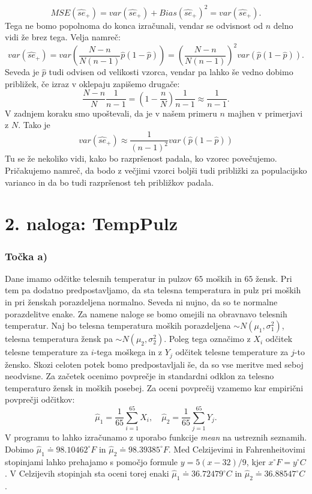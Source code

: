\documentclass[12pt, letterpaper]{article}
\begin{document}
\[
MSE(\hat{se}_+) = var(\hat{se}_+) + Bias(\hat{se}_+)^2 = var(\hat{se}_+).
\]
Tega ne bomo popolnoma do konca izračunali, vendar se odvisnost od $n$ delno vidi že brez tega. Velja namreč:
\[
var(\hat{se}_+) = var\left(\frac{N-n}{N(n-1)}\hat{p}(1 - \hat{p})\right) = \left(\frac{N-n}{N(n-1)}\right)^2 var(\hat{p}(1 - \hat{p})).
\]
Seveda je $\hat{p}$ tudi odvisen od velikosti vzorca, vendar pa lahko še vedno dobimo približek, če izraz v oklepaju zapišemo drugače:
\[
\frac{N-n}{N}\frac{1}{n-1} = \left(1 - \frac{n}{N}\right)\frac{1}{n-1} \approx \frac{1}{n-1}.
\]
V zadnjem koraku smo upoštevali, da je v našem primeru $n$ majhen v primerjavi z $N$. Tako je
\[
var(\hat{se}_+) \approx \frac{1}{(n-1)^2}var(\hat{p}(1 - \hat{p}))
\]
Tu se že nekoliko vidi, kako bo razpršenost padala, ko vzorec povečujemo. Pričakujemo namreč, da bodo z večjimi vzorci boljši tudi približki za populacijsko varianco in da bo tudi razpršenost teh približkov padala.

\section*{2. naloga: TempPulz}

\subsubsection*{Točka a)} Dane imamo odčitke telesnih temperatur in pulzov $65$ moških in $65$ žensk. Pri tem pa dodatno predpostavljamo, da sta telesna temperatura in pulz pri moških in pri ženskah porazdeljena normalno. Seveda ni nujno, da so te normalne porazdelitve enake. Za namene naloge se bomo omejili na obravnavo telesnih temperatur. Naj bo telesna temperatura moških porazdeljena $\sim N(\mu_1, \sigma^2_1)$, telesna temperatura žensk pa $\sim N(\mu_2,\sigma^2_2)$. Poleg tega označimo z $X_i$ odčitek telesne temperature za $i$-tega moškega in z $Y_j$ odčitek telesne temperature za $j$-to žensko. Skozi celoten potek bomo predpostavljali še, da so vse meritve med seboj neodvisne. Za začetek ocenimo povprečje in standardni odklon za telesno temperaturo žensk in moških posebej. Za oceni povprečij vzamemo kar empirični povprečji odčitkov:
\[
\hat{\mu}_1 = \frac{1}{65}\sum_{i=1}^{65} X_i, \quad \hat{\mu}_2 = \frac{1}{65}\sum_{j=1}^{65} Y_j.
\]
V programu to lahko izračunamo z uporabo funkcije \emph{mean} na ustreznih seznamih. Dobimo $\hat{\mu}_1 \doteq 98.10462^{\circ}F$ in $\hat{\mu}_2 \doteq 98.39385^{\circ}F$. Med Celzijevimi in Fahrenheitovimi stopinjami lahko prehajamo s pomočjo formule $y = 5(x-32)/9$, kjer $x^{\circ}F = y^{\circ}C$. V Celzijevih stopinjah sta oceni torej enaki $\hat{\mu}_1 \doteq 36.72479^{\circ}C$ in $\hat{\mu}_2 \doteq 36.88547^{\circ}C$.
\end{document}

